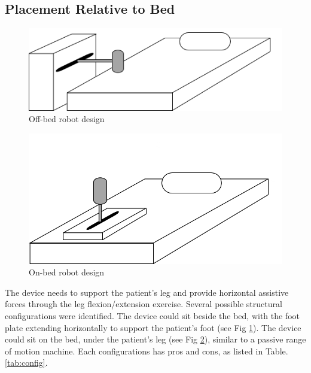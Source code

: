 \documentclass[12pt]{report}
\begin{document}
		
		\subsection{Placement Relative to Bed}
		
			
	\begin{figure}[t] 
		\centering
		\includegraphics[width=0.75\linewidth]{off-bed}
		\caption{Off-bed robot design}
		\label{fig:off-bed}
	\end{figure}	
	
	
		
	\begin{figure}[t] 
		\centering
		\includegraphics[width=0.75\linewidth]{on-bed}
		\caption{On-bed robot design}
		\label{fig:on-bed}
	\end{figure}	
	
		
		The device needs to support the patient's leg and provide horizontal assistive forces through the leg flexion/extension exercise. Several possible structural configurations were identified. The device could sit beside the bed, with the foot plate extending horizontally to support the patient's foot (see Fig \ref{fig:off-bed}). The device could sit on the bed, under the patient's leg (see Fig \ref{fig:on-bed}), similar to a passive range of motion machine. Each configurations has pros and cons, as listed in Table. \ref{tab:config}.
\end{document}

